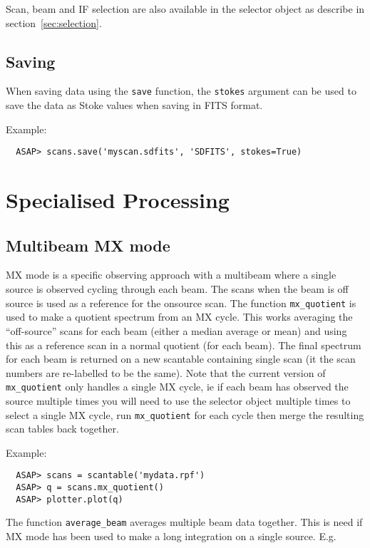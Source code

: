 \documentclass[11pt]{article}
\newcommand{\cmd}[1]{{\tt #1}}
\begin{document}
Scan, beam and IF selection are also available in the selector object as
describe in section~\ref{sec:selection}.

\subsection{Saving}

When saving data using the \cmd{save}
function, the \cmd{stokes} argument can be used to save the data as
Stoke values when saving in FITS format.

Example:

\begin{verbatim}
  ASAP> scans.save('myscan.sdfits', 'SDFITS', stokes=True)
\end{verbatim}

\section{Specialised Processing}

\subsection{Multibeam MX mode}

MX mode is a specific observing approach with a multibeam where a
single source is observed cycling through each beam. The scans when
the beam is off source is used as a reference for the onsource
scan. The function \cmd{mx\_quotient} is used to make a quotient
spectrum from an MX cycle. This works averaging the ``off-source''
scans for each beam (either a median average or mean) and using this
as a reference scan in a normal quotient (for each beam). The final
spectrum for each beam is returned on a new scantable containing
single scan (it the scan numbers are re-labelled to be the same). Note
that the current version of \cmd{mx\_quotient} only handles a single
MX cycle, ie if each beam has observed the source multiple times you
will need to use the selector object multiple times to select a single
MX cycle, run \cmd{mx\_quotient} for each cycle then merge the
resulting scan tables back together.

Example:

\begin{verbatim}
  ASAP> scans = scantable('mydata.rpf')
  ASAP> q = scans.mx_quotient()
  ASAP> plotter.plot(q)
\end{verbatim}

The function \cmd{average\_beam} averages multiple beam data
together. This is need if MX mode has been used to make a long
integration on a single source. E.g.
\end{document}
